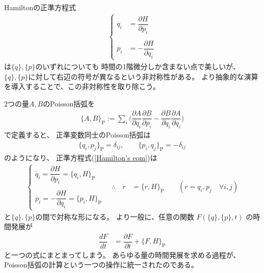 Hamiltonの正準方程式
\begin{align}
   \begin{cases}
      \dot{q_i} &= \dfrac{\partial H}{\partial p_i}
    \\
    \\
      \dot{p_i} &= - \dfrac{\partial H}{\partial q_i}
    \end{cases}
\label{Hamilton's eom}
\end{align}
は$\{q\},\{p\}$のいずれについても
時間の1階微分しか含まない点で美しいが、
$\{q\},\{p\}$に対して右辺の符号が異なるという非対称性がある。
より抽象的な演算を導入することで、この非対称性を取り除こう。

2つの量$A,B$のPoisson括弧を
\begin{align}
    \{A, B\}_{ \mathrm{P} }
    := \sum_i \bigg(
        \dfrac{ \partial A }{ \partial q_i }
        \dfrac{ \partial B }{ \partial p_i }
    -
        \dfrac{ \partial B }{ \partial q_i }
        \dfrac{ \partial A }{ \partial q_i }
    \bigg)
\end{align}
で定義すると、
正準変数同士のPoisson括弧は
\begin{align}
   \{q_i, p_j\}_{ \mathrm{P} }
   = \delta_{ij}
,\qquad
   \{p_i, q_j\}_{ \mathrm{P} }
   = - \delta_{ij}
\end{align}
のようになり、
正準方程式(\ref{Hamilton's eom})は
\begin{align}
    \begin{cases}
        \dot{q_i}
        = \dfrac{\partial H}{\partial p_i}
        = \{q_i, H\}_{ \mathrm{P} }
      \\
      \\
        \dot{p_i}
        = - \dfrac{\partial H}{\partial q_i}
        = \{p_i, H\}_{ \mathrm{P} }
      \end{cases}
\quad
\therefore
\quad
    \dot{r} &= \{r, H\}_{ \mathrm{P} }
\qquad
    ( r = q_i, p_j \quad\forall i, j )
\label{Hamilton e.o.m. in Poisson bracket}
\end{align}
と$\{q\},\{p\}$の間で対称な形になる。
より一般に、任意の関数
$F( \{q\},\{p\} , t )$
の時間発展が
\begin{align}
    \dfrac{ d F }{ dt } &= \dfrac{ \partial F }{ \partial t } + \{F, H\}_{ \mathrm{P} }
\label{time evolution in Poisson bracket}
\end{align}
と一つの式にまとまってしまう。
あらゆる量の時間発展を求める過程が、
Poisson括弧の計算という一つの操作に統一されたのである。
